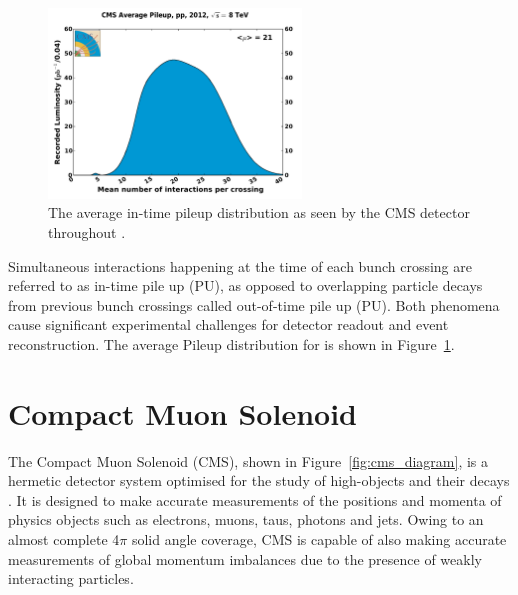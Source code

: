 \begin{figure}
  \centering
  \includegraphics[width=0.6\textwidth]{Figs/machine/pileup_pp_2012.pdf}
  \caption{The average in-time pileup distribution as seen by the CMS detector
  throughout \runone \cite{cmslumi}.}
  \label{fig:pileup_runone}
\end{figure}

Simultaneous interactions happening at the time
of each bunch crossing are referred to as in-time pile up (PU), as opposed to 
overlapping particle decays from previous bunch crossings called out-of-time 
pile up (PU). Both phenomena cause significant
experimental challenges for detector readout and event reconstruction.
The average Pileup distribution for \runone is shown in
Figure~\ref{fig:pileup_runone}.


\section{Compact Muon Solenoid}  %
\label{sec:detector_overview}

The Compact Muon Solenoid (CMS), shown in Figure~\ref{fig:cms_diagram}, is a
hermetic detector system  optimised for the study of high-\Pt objects and their
decays \cite{CMSexperiment}.
It is designed to make accurate measurements of the positions and momenta of
physics objects such as electrons, muons, taus,
photons and jets. Owing to an almost complete 4$\pi$ solid angle coverage, CMS is 
capable of also making accurate measurements of global momentum imbalances due
to the presence of weakly interacting particles.

